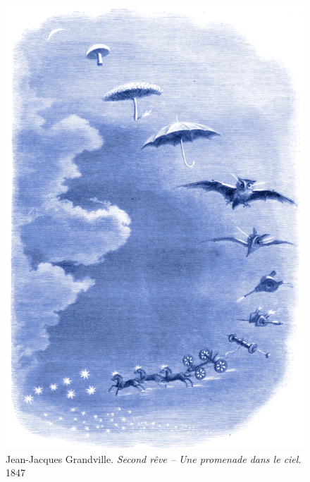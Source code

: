 \centering

\begin{figure}[htb]
    \captionsetup{labelformat=empty, justification=centering, skip=20pt}
	\includegraphics[width=\textwidth]{Artworks/Grandville_promenade.jpeg}
	\caption[]{Jean-Jacques Grandville. \textit{Second rêve – Une promenade dans le ciel}. 1847}
\end{figure}

\cleardoublepage
